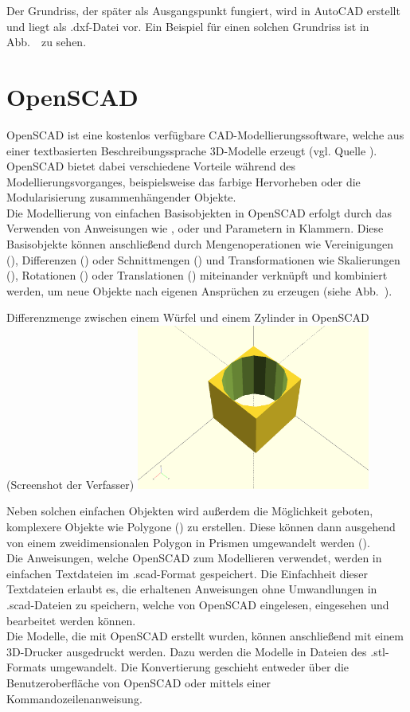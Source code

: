 Der Grundriss, der später als Ausgangspunkt fungiert, wird in AutoCAD erstellt und liegt als .dxf-Datei vor.
Ein Beispiel für einen solchen Grundriss ist in Abb.~\thebildnr\ zu sehen.

\section{OpenSCAD}
OpenSCAD ist eine kostenlos verfügbare CAD-Modellierungssoftware, welche aus einer textbasierten Beschreibungssprache 3D-Modelle erzeugt (vgl. Quelle \cite{OpenScad}).
OpenSCAD bietet dabei verschiedene Vorteile während des Modellierungsvorganges, beispielsweise das farbige Hervorheben oder die Modularisierung zusammenhängender Objekte. \\
Die Modellierung von einfachen Basisobjekten in OpenSCAD erfolgt durch das Verwenden von Anweisungen wie ,  oder  und Parametern in Klammern.
Diese Basisobjekte können anschließend durch Mengenoperationen wie Vereinigungen (), Differenzen () oder Schnittmengen () und Transformationen wie Skalierungen (), Rotationen () oder Translationen () miteinander verknüpft und kombiniert werden, um neue Objekte nach eigenen Ansprüchen zu erzeugen (siehe Abb.~\thebildnrnext). \\

\begin{Bild}{Differenzmenge zwischen einem Würfel und einem Zylinder in OpenSCAD (Screenshot der Verfasser)}
	\includegraphics[width= 290px]{Bilder/OpenSCAD_Example}
\end{Bild}

Neben solchen einfachen Objekten wird außerdem die Möglichkeit geboten, komplexere Objekte wie Polygone () zu erstellen.
Diese können dann ausgehend von einem zweidimensionalen Polygon in Prismen umgewandelt werden (). \\
Die Anweisungen, welche OpenSCAD zum Modellieren verwendet, werden in einfachen Textdateien im .scad-Format gespeichert.
Die Einfachheit dieser Textdateien erlaubt es, die erhaltenen Anweisungen ohne Umwandlungen in .scad-Dateien zu speichern, welche von OpenSCAD eingelesen, eingesehen und bearbeitet werden können. \\
Die Modelle, die mit OpenSCAD erstellt wurden, können anschließend mit einem 3D-Drucker ausgedruckt werden.
Dazu werden die Modelle in Dateien des .stl-Formats umgewandelt.
Die Konvertierung geschieht entweder über die Benutzeroberfläche von OpenSCAD oder mittels einer Kommandozeilenanweisung.

